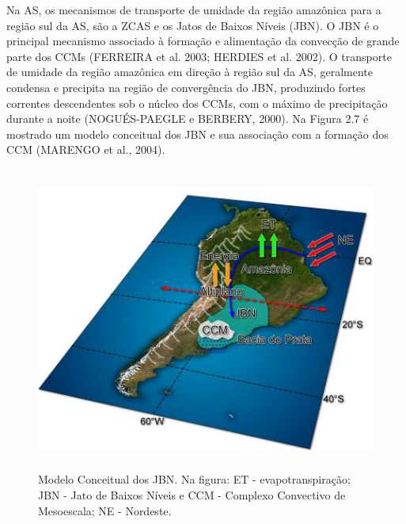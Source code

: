 Na AS, os mecanismos de transporte de umidade da região amazônica para a região sul da AS, são a ZCAS e os Jatos de Baixos Níveis (JBN). O JBN é o principal mecanismo associado à formação e alimentação da convecção de grande parte dos CCMs (FERREIRA et al. 2003; HERDIES et al. 2002). O transporte de umidade da região amazônica em direção à região sul da AS, geralmente condensa e precipita na região de convergência do JBN, produzindo fortes correntes descendentes sob o núcleo dos CCMs, com o máximo de precipitação durante a noite (NOGUÉS-PAEGLE e BERBERY, 2000). Na Figura 2.7 é mostrado um modelo conceitual dos JBN e sua associação com a formação dos CCM (MARENGO et al., 2004).

\begin{figure}
\centering
\includegraphics[height=10cm]{./figs/fig10.png}
\caption{Modelo Conceitual dos JBN. Na figura: ET - evapotranspiração; JBN - Jato de Baixos Níveis e CCM - Complexo Convectivo de Mesoescala; NE - Nordeste.}
\label{fig10}
\end{figure}
